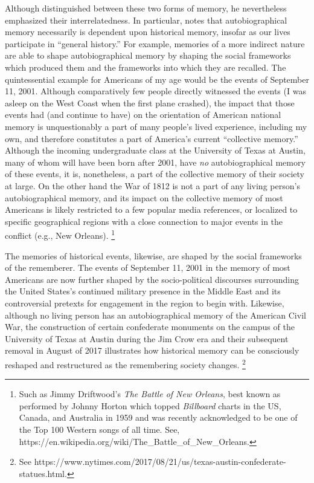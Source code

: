 Although \halbwachs distinguished between these two forms of memory, he nevertheless emphasized their interrelatedness. In particular, \halbwachs notes that autobiographical memory necessarily is dependent upon historical memory, insofar as our lives participate in ``general history.''%
    \autocite[52]{halbwachs1980}
For example, memories of a more indirect nature are able to shape autobiographical memory by shaping the social frameworks which produced them and the frameworks into which they are recalled. The quintessential example for Americans of my age would be the events of September 11, 2001. Although comparatively few people directly witnessed the events (I was asleep on the West Coast when the first plane crashed), the impact that those events had (and continue to have) on the orientation of American national memory is unquestionably a part of many people's lived experience, including my own, and therefore constitutes a part of America's current ``collective memory.'' Although the incoming undergraduate class at the University of Texas at Austin, many of whom will have been born after 2001, have \emph{no} autobiographical memory of these events, it is, nonetheless, a part of the collective memory of their society at large. On the other hand the War of 1812 is not a part of any living person's autobiographical memory, and its impact on the collective memory of most Americans is likely restricted to a few popular media references, or localized to specific geographical regions with a close connection to major events in the conflict (e.g., New Orleans).%
    \footnote{%
        Such as Jimmy Driftwood's \emph{The Battle of New   Orleans}, best known as performed by Johnny Horton which topped   \emph{Billboard} charts in the US, Canada, and Australia in 1959 and   was recently acknowledged to be one of the Top 100 Western songs of   all time. See,   https://en.wikipedia.org/wiki/The\_Battle\_of\_New\_Orleans.}

The memories of historical events, likewise, are shaped by the social frameworks of the rememberer. The events of September 11, 2001 in the memory of most Americans are now further shaped by the socio-political discourses surrounding the United States's continued military presence in the Middle East and its controversial pretexts for engagement in the region to begin with. Likewise, although no living person has an autobiographical memory of the American Civil War, the construction of certain confederate monuments on the campus of the University of Texas at Austin during the Jim Crow era and their subsequent removal in August of 2017 illustrates how historical memory can be consciously reshaped and restructured as the remembering society changes.%
    \footnote{%
        See https://www.nytimes.com/2017/08/21/us/texas-austin-confederate-statues.html.}  


